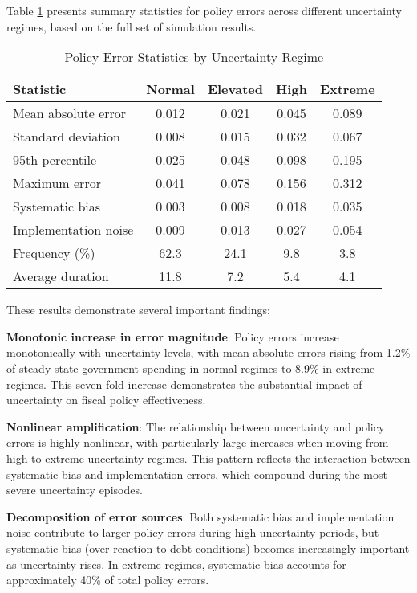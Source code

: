 \documentclass[5p,authoryear]{elsarticle}
\begin{document}
Table \ref{tab:policy_errors} presents summary statistics for policy errors across different uncertainty regimes, based on the full set of simulation results.

\begin{table}[h!]
\centering
\caption{Policy Error Statistics by Uncertainty Regime}
\label{tab:policy_errors}
\begin{tabular}{lcccc}
\toprule
Statistic & Normal & Elevated & High & Extreme \\
\midrule
Mean absolute error & 0.012 & 0.021 & 0.045 & 0.089 \\
Standard deviation & 0.008 & 0.015 & 0.032 & 0.067 \\
95th percentile & 0.025 & 0.048 & 0.098 & 0.195 \\
Maximum error & 0.041 & 0.078 & 0.156 & 0.312 \\
\midrule
Systematic bias & 0.003 & 0.008 & 0.018 & 0.035 \\
Implementation noise & 0.009 & 0.013 & 0.027 & 0.054 \\
\midrule
Frequency (\%) & 62.3 & 24.1 & 9.8 & 3.8 \\
Average duration & 11.8 & 7.2 & 5.4 & 4.1 \\
\bottomrule
\end{tabular}
\end{table}

These results demonstrate several important findings:

\textbf{Monotonic increase in error magnitude}: Policy errors increase monotonically with uncertainty levels, with mean absolute errors rising from 1.2\% of steady-state government spending in normal regimes to 8.9\% in extreme regimes. This seven-fold increase demonstrates the substantial impact of uncertainty on fiscal policy effectiveness.

\textbf{Nonlinear amplification}: The relationship between uncertainty and policy errors is highly nonlinear, with particularly large increases when moving from high to extreme uncertainty regimes. This pattern reflects the interaction between systematic bias and implementation errors, which compound during the most severe uncertainty episodes.

\textbf{Decomposition of error sources}: Both systematic bias and implementation noise contribute to larger policy errors during high uncertainty periods, but systematic bias (over-reaction to debt conditions) becomes increasingly important as uncertainty rises. In extreme regimes, systematic bias accounts for approximately 40\% of total policy errors.
\end{document}
